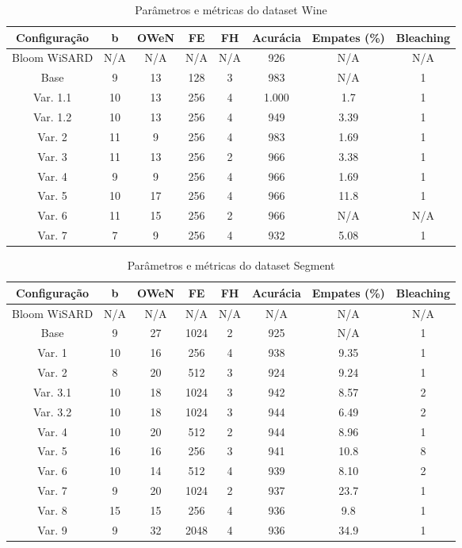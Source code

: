 \documentclass{article}
\begin{document}
{\begin{table}[H]
\caption{Parâmetros e métricas do dataset Wine}
\begin{tabular}{|c|c|c|c|c|c|c|c|}
\hline
\textbf{Configuração} & \textbf{b} & \textbf{OWeN} & \textbf{FE} & \textbf{FH} & \textbf{Acurácia} & \textbf{Empates (\%)} & \textbf{Bleaching} \\
\hline
Bloom WiSARD & N/A & N/A & N/A & N/A & 926 & N/A & N/A \\
\hline
Base & 9 & 13 & 128 & 3 & 983 & N/A & 1 \\
\hline
Var. 1.1 & 10 & 13 & 256 & 4 & 1.000 & 1.7 & 1 \\
\hline
Var. 1.2 & 10 & 13 & 256 & 4 & 949 & 3.39 & 1 \\
\hline
Var. 2 & 11 & 9 & 256 & 4 & 983 & 1.69 & 1 \\
\hline
Var. 3 & 11 & 13 & 256 & 2 & 966 & 3.38 & 1 \\
\hline
Var. 4 & 9 & 9 & 256 & 4 & 966 & 1.69 & 1 \\
\hline
Var. 5 & 10 & 17 & 256 & 4 & 966 & 11.8 & 1 \\
\hline
Var. 6 & 11 & 15 & 256 & 2 & 966 & N/A & N/A \\
\hline
Var. 7 & 7 & 9 & 256 & 4 & 932 & 5.08 & 1 \\
\hline
\end{tabular}
\end{table}

\begin{table}[H]
\caption{Parâmetros e métricas do dataset Segment}
\begin{tabular}{|c|c|c|c|c|c|c|c|}
\hline
\textbf{Configuração} & \textbf{b} & \textbf{OWeN} & \textbf{FE} & \textbf{FH} & \textbf{Acurácia} & \textbf{Empates (\%)} & \textbf{Bleaching} \\
\hline
Bloom WiSARD & N/A & N/A & N/A & N/A & N/A & N/A & N/A \\
\hline
Base & 9 & 27 & 1024 & 2 & 925 & N/A & 1 \\
\hline
Var. 1 & 10 & 16 & 256 & 4 & 938 & 9.35 & 1 \\
\hline
Var. 2 & 8 & 20 & 512 & 3 & 924 & 9.24 & 1 \\
\hline
Var. 3.1 & 10 & 18 & 1024 & 3 & 942 & 8.57 & 2 \\
\hline
Var. 3.2 & 10 & 18 & 1024 & 3 & 944 & 6.49 & 2 \\
\hline
Var. 4 & 10 & 20 & 512 & 2 & 944 & 8.96 & 1 \\
\hline
Var. 5 & 16 & 16 & 256 & 3 & 941 & 10.8 & 8 \\
\hline
Var. 6 & 10 & 14 & 512 & 4 & 939 & 8.10 & 2 \\
\hline
Var. 7 & 9 & 20 & 1024 & 2 & 937 & 23.7 & 1 \\
\hline
Var. 8 & 15 & 15 & 256 & 4 & 936 & 9.8 & 1 \\
\hline
Var. 9 & 9 & 32 & 2048 & 4 & 936 & 34.9 & 1 \\
\hline
\end{tabular}
\end{table}

}
\end{document}
